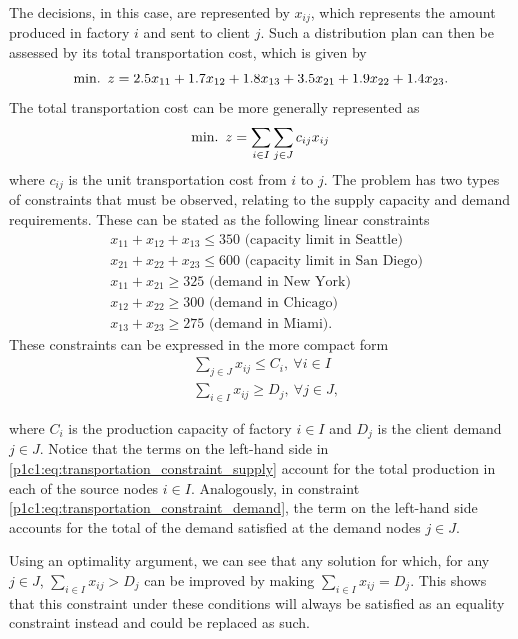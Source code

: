 The decisions, in this case, are represented by $x_{ij}$, which represents the amount produced in factory $i$ and sent to client $j$. Such a distribution plan can then be assessed by its total transportation cost, which is given by
%
$$ 
\mathop{\text{min.~}} z = 2.5x_{11} + 1.7x_{12} + 1.8x_{13} + 3.5x_{21} + 1.9x_{22} + 1.4x_{23}.
$$
%
The total transportation cost can be more generally represented as
%
$$
\mathop{\text{min.~}} z = \sum_{i \in I}\sum_{j \in J}c_{ij}x_{ij}
$$
%
where $c_{ij}$ is the unit transportation cost from $i$ to $j$.
%
The problem has two types of constraints that must be observed, relating to the supply capacity and demand requirements. These can be stated as the following linear constraints
%
\begin{align*}
	& x_{11} + x_{12} + x_{13} \leq 350 \text{ (capacity limit in Seattle)}\\
	& x_{21} + x_{22} + x_{23} \leq 600 \text{ (capacity limit in San Diego)}\\
	& x_{11} + x_{21} \geq 325 \text{ (demand in New York)}\\
	& x_{12} + x_{22} \geq 300 \text{ (demand in Chicago)}\\
	& x_{13} + x_{23} \geq 275 \text{ (demand in Miami)}.
\end{align*}
%
These constraints can be expressed in the more compact form
%
\begin{align}
	& \sum_{j \in J} x_{ij} \leq C_i, ~\forall i \in I \label{p1c1:eq:transportation_constraint_supply}\\
	& \sum_{i \in I} x_{ij} \geq D_j, ~\forall j \in J, \label{p1c1:eq:transportation_constraint_demand}
\end{align}

where $C_i$ is the production capacity of factory $i \in I$ and $D_j$ is the client demand $j \in J$. Notice that the terms on the left-hand side in \eqref{p1c1:eq:transportation_constraint_supply} account for the total production in each of the source nodes $i \in I$. Analogously, in constraint \eqref{p1c1:eq:transportation_constraint_demand}, the term on the left-hand side accounts for the total of the demand satisfied at the demand nodes $j \in J$. 

Using an optimality argument, we can see that any solution for which, for any $j \in J$, $\sum_{i \in I} x_{ij} > D_j$ can be improved by making $\sum_{i \in I} x_{ij} = D_j$. This shows that this constraint under these conditions will always be satisfied as an equality constraint instead and could be replaced as such. 


